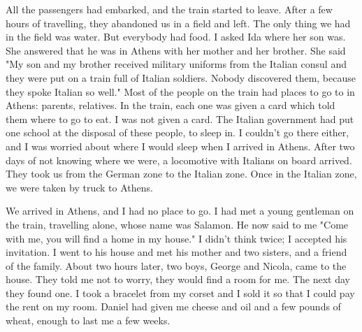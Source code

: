 All the passengers had embarked, and the train started to leave. 
After a few hours of travelling, they abandoned us in a field and left. 
The only thing we had in the field was water. But everybody had food. 
I asked Ida where her son was. She answered that he was in Athens with 
her mother and her brother. She said "My son and my brother received 
military uniforms from the Italian consul and they were put on a train 
full of Italian soldiers. Nobody discovered them, because they spoke 
Italian so well." 
Most of the people on the train had places to go to in Athens: parents, relatives. In the train, each one was given a card which told them where to go to eat. I was not given a card. The Italian government had put one school at the disposal of these people, to sleep in. I couldn't go there either, and I was worried about where I would sleep when I arrived in Athens. After two days of not knowing where we were, a locomotive with Italians on board arrived. They took us from the German zone to the Italian zone. Once in the Italian zone, we were taken 
by truck to Athens. 

We arrived in Athens, and I had no place to go. I had met a young gentleman on the train, travelling alone, whose name was Salamon. He now said to me "Come with me, you will find a home in my house." I didn't think twice; I accepted his invitation. I went to his house and 
met his mother and two sisters, and a friend of the family. About two 
hours later, two boys, George and Nicola, came to the house. They told 
me not to worry, they would find a room for me. The next day they found 
one. I took a bracelet from my corset and I sold it so that I could pay 
the rent on my room. Daniel had given me cheese and oil and a few pounds
of wheat, enough to last me a few weeks. 

